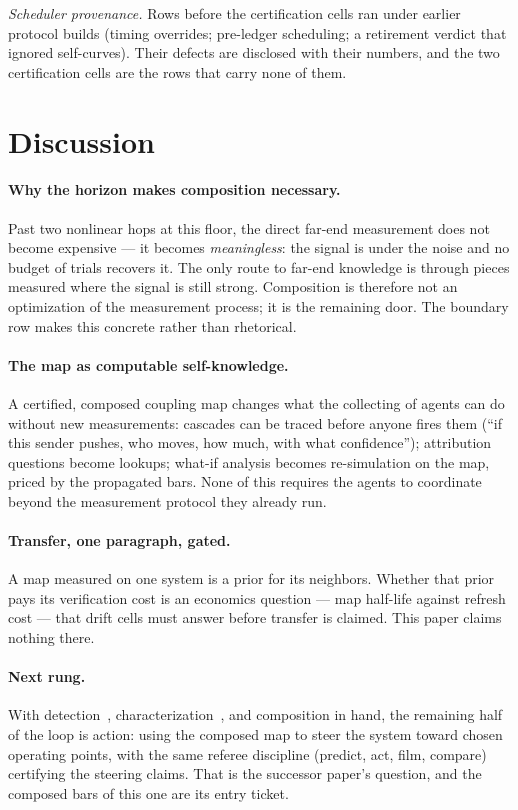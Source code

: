 \documentclass[11pt,a4paper]{article}
\begin{document}
\emph{Scheduler provenance.} Rows before the certification cells ran
under earlier protocol builds (timing overrides; pre-ledger
scheduling; a retirement verdict that ignored self-curves). Their
defects are disclosed with their numbers, and the two certification
cells are the rows that carry none of them.

\section{Discussion}
\label{sec:discussion}

\paragraph{Why the horizon makes composition necessary.}
Past two nonlinear hops at this floor, the direct far-end measurement
does not become expensive --- it becomes \emph{meaningless}: the
signal is under the noise and no budget of trials recovers it. The
only route to far-end knowledge is through pieces measured where the
signal is still strong. Composition is therefore not an optimization
of the measurement process; it is the remaining door. The boundary
row makes this concrete rather than rhetorical.

\paragraph{The map as computable self-knowledge.}
A certified, composed coupling map changes what the collecting of
agents can do without new measurements: cascades can be traced
before anyone fires them (``if this sender pushes, who moves, how
much, with what confidence''); attribution questions become lookups;
what-if analysis becomes re-simulation on the map, priced by the
propagated bars. None of this requires the agents to coordinate
beyond the measurement protocol they already run.

\paragraph{Transfer, one paragraph, gated.}
A map measured on one system is a prior for its neighbors. Whether
that prior pays its verification cost is an economics question ---
map half-life against refresh cost --- that drift cells must answer
before transfer is claimed. This paper claims nothing there.

\paragraph{Next rung.}
With detection~\cite{p1}, characterization~\cite{p2}, and composition
in hand, the remaining half of the loop is action: using the composed
map to steer the system toward chosen operating points, with the same
referee discipline (predict, act, film, compare) certifying the
steering claims. That is the successor paper's question, and the
composed bars of this one are its entry ticket.
\end{document}
